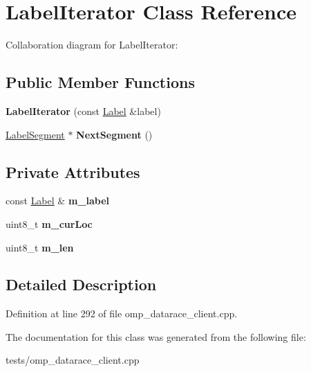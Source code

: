 \hypertarget{classLabelIterator}{\section{Label\-Iterator Class Reference}
\label{classLabelIterator}
}


Collaboration diagram for Label\-Iterator\-:
\subsection*{Public Member Functions}
\begin{DoxyCompactItemize}
\item 
\hypertarget{classLabelIterator_af370588e2997f1fa3e06efddaa2173b9}{{\bfseries Label\-Iterator} (const \hyperlink{classLabel}{Label} \&label)}\label{classLabelIterator_af370588e2997f1fa3e06efddaa2173b9}

\item 
\hypertarget{classLabelIterator_a9190853b7a574b74ee69356dc4dd6cca}{\hyperlink{structLabelSegment}{Label\-Segment} $\ast$ {\bfseries Next\-Segment} ()}\label{classLabelIterator_a9190853b7a574b74ee69356dc4dd6cca}

\end{DoxyCompactItemize}
\subsection*{Private Attributes}
\begin{DoxyCompactItemize}
\item 
\hypertarget{classLabelIterator_a3028cd8bcab7018703e165bc22df580c}{const \hyperlink{classLabel}{Label} \& {\bfseries m\-\_\-label}}\label{classLabelIterator_a3028cd8bcab7018703e165bc22df580c}

\item 
\hypertarget{classLabelIterator_a96185626cff6e9d3322b0973c438b085}{uint8\-\_\-t {\bfseries m\-\_\-cur\-Loc}}\label{classLabelIterator_a96185626cff6e9d3322b0973c438b085}

\item 
\hypertarget{classLabelIterator_adbe2a6f26ff563475cda773059034c3a}{uint8\-\_\-t {\bfseries m\-\_\-len}}\label{classLabelIterator_adbe2a6f26ff563475cda773059034c3a}

\end{DoxyCompactItemize}


\subsection{Detailed Description}


Definition at line 292 of file omp\-\_\-datarace\-\_\-client.\-cpp.



The documentation for this class was generated from the following file\-:\begin{DoxyCompactItemize}
\item 
tests/omp\-\_\-datarace\-\_\-client.\-cpp\end{DoxyCompactItemize}
